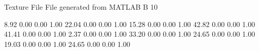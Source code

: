 Texture File
File generated from MATLAB
B 10

    8.92   0.00   0.00   1.00
   22.04   0.00   0.00   1.00
   15.28   0.00   0.00   1.00
   42.82   0.00   0.00   1.00
   41.41   0.00   0.00   1.00
    2.37   0.00   0.00   1.00
   33.20   0.00   0.00   1.00
   24.65   0.00   0.00   1.00
   19.03   0.00   0.00   1.00
   24.65   0.00   0.00   1.00